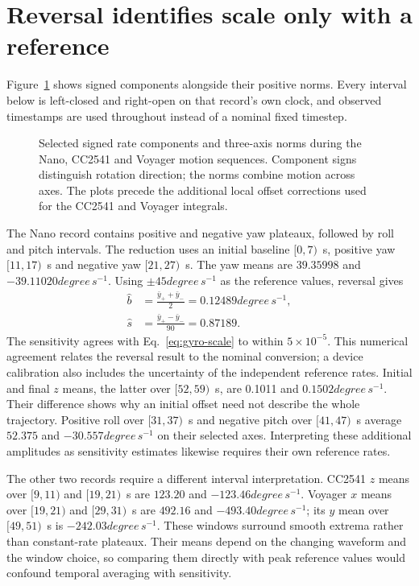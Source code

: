 \section{Reversal identifies scale only with a reference}
\label{sec:gyro-reversal}
Figure~\ref{fig:gyro-examples} shows signed components alongside their positive norms. Every interval below is left-closed and right-open on that record's own clock, and observed timestamps are used throughout instead of a nominal fixed timestep.

\begin{figure}[t]
\centering

\caption{Selected signed rate components and three-axis norms during the Nano, CC2541 and Voyager motion sequences. Component signs distinguish rotation direction; the norms combine motion across axes. The plots precede the additional local offset corrections used for the CC2541 and Voyager integrals.}
\label{fig:gyro-examples}
\end{figure}

The Nano record contains positive and negative yaw plateaux, followed by roll and pitch intervals. The reduction uses an initial baseline $[0,7)$~s, positive yaw $[11,17)$~s and negative yaw $[21,27)$~s. The yaw means are $39.35998$ and $-39.11020\unit{degree\,s^{-1}}$. Using $\pm45\unit{degree\,s^{-1}}$ as the reference values, reversal gives
\begin{equation}
 \begin{aligned}
 \widehat b&=\frac{\bar y_++\bar y_-}{2}=0.12489\unit{degree\,s^{-1}},\\
 \widehat s&=\frac{\bar y_+-\bar y_-}{90}=0.87189.
 \end{aligned}
 \label{eq:gyro-reversal}
\end{equation}
The sensitivity agrees with Eq.~\ref{eq:gyro-scale} to within $5\times10^{-5}$. This numerical agreement relates the reversal result to the nominal conversion; a device calibration also includes the uncertainty of the independent reference rates. Initial and final $z$ means, the latter over $[52,59)$~s, are 0.1011 and $0.1502\unit{degree\,s^{-1}}$. Their difference shows why an initial offset need not describe the whole trajectory. Positive roll over $[31,37)$~s and negative pitch over $[41,47)$~s average $52.375$ and $-30.557\unit{degree\,s^{-1}}$ on their selected axes. Interpreting these additional amplitudes as sensitivity estimates likewise requires their own reference rates.

The other two records require a different interval interpretation. CC2541 $z$ means over $[9,11)$ and $[19,21)$~s are $123.20$ and $-123.46\unit{degree\,s^{-1}}$. Voyager $x$ means over $[19,21)$ and $[29,31)$~s are $492.16$ and $-493.40\unit{degree\,s^{-1}}$; its $y$ mean over $[49,51)$~s is $-242.03\unit{degree\,s^{-1}}$. These windows surround smooth extrema rather than constant-rate plateaux. Their means depend on the changing waveform and the window choice, so comparing them directly with peak reference values would confound temporal averaging with sensitivity.

